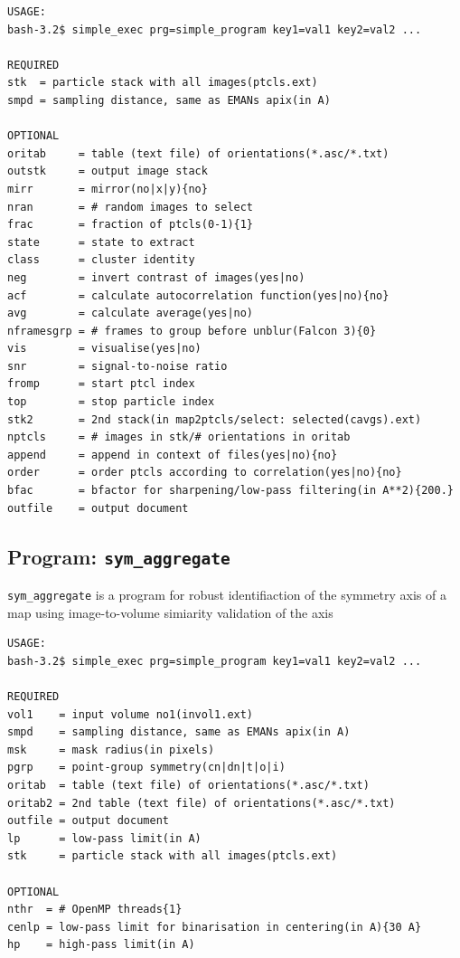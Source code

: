 \documentclass[a4paper,11pt]{article}
\newcommand{\prgname}[1]{\textcolor{NavyBlue}{\texttt{#1}}}
\begin{document}
\begin{verbatim}
USAGE:
bash-3.2$ simple_exec prg=simple_program key1=val1 key2=val2 ...

REQUIRED
stk  = particle stack with all images(ptcls.ext)
smpd = sampling distance, same as EMANs apix(in A)

OPTIONAL
oritab     = table (text file) of orientations(*.asc/*.txt)
outstk     = output image stack
mirr       = mirror(no|x|y){no}
nran       = # random images to select
frac       = fraction of ptcls(0-1){1}
state      = state to extract
class      = cluster identity
neg        = invert contrast of images(yes|no)
acf        = calculate autocorrelation function(yes|no){no}
avg        = calculate average(yes|no)
nframesgrp = # frames to group before unblur(Falcon 3){0}
vis        = visualise(yes|no)
snr        = signal-to-noise ratio
fromp      = start ptcl index
top        = stop particle index
stk2       = 2nd stack(in map2ptcls/select: selected(cavgs).ext)
nptcls     = # images in stk/# orientations in oritab
append     = append in context of files(yes|no){no}
order      = order ptcls according to correlation(yes|no){no}
bfac       = bfactor for sharpening/low-pass filtering(in A**2){200.}
outfile    = output document
\end{verbatim}

\subsection{Program: \prgname{sym\_aggregate}}
\label{sym_aggregate}
\prgname{sym\_aggregate} is a program for robust identifiaction of the symmetry axis of a map using image-to-volume simiarity validation of the axis

\begin{verbatim}
USAGE:
bash-3.2$ simple_exec prg=simple_program key1=val1 key2=val2 ...

REQUIRED
vol1    = input volume no1(invol1.ext)
smpd    = sampling distance, same as EMANs apix(in A)
msk     = mask radius(in pixels)
pgrp    = point-group symmetry(cn|dn|t|o|i)
oritab  = table (text file) of orientations(*.asc/*.txt)
oritab2 = 2nd table (text file) of orientations(*.asc/*.txt)
outfile = output document
lp      = low-pass limit(in A)
stk     = particle stack with all images(ptcls.ext)

OPTIONAL
nthr  = # OpenMP threads{1}
cenlp = low-pass limit for binarisation in centering(in A){30 A}
hp    = high-pass limit(in A)
\end{verbatim}
\end{document}
